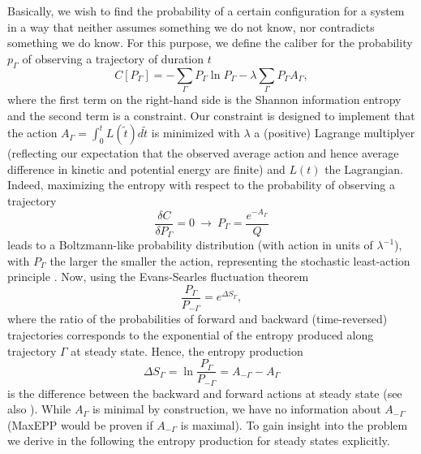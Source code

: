 \documentclass[aps,prl,reprint,singlecolumn,superscriptaddress]{revtex4}
\begin{document}
{Basically, we wish to find the probability of a certain configuration for a system in a way that neither assumes something we 
do not know, nor contradicts something we do know.
For this purpose, we define the {caliber for the probability $p_\Gamma$ of observing a trajectory of duration $t$
\begin{equation}
C[P_\Gamma]=-\sum_{\Gamma}P_\Gamma\ln P_{\Gamma}-\lambda\sum_\Gamma P_\Gamma A_\Gamma,
\end{equation}
where the first term on the right-hand side is the Shannon information entropy and the second term is a constraint.} Our constraint 
is designed to implement that the action $A_\Gamma=\int_{0}^{t}L(\tilde t) d\tilde t$ is minimized with $\lambda$ a (positive) Lagrange multiplyer 
(reflecting our expectation that the observed average action and hence average difference in kinetic and potential energy are finite) 
and $L(t)$ the Lagrangian. Indeed, maximizing the entropy with respect to the probability of observing a trajectory
\begin{equation}
\frac{\delta C}{\delta P_\Gamma}=0\ \rightarrow\  P_\Gamma=\frac{e^{-A_\Gamma}}{Q}
\end{equation}
leads to a Boltzmann-like probability distribution {(with action in units of $\lambda^{-1}$)}, with $P_\Gamma$ the larger the smaller the action, 
representing the stochastic least-action principle \cite{wang06,seifert12}. Now, using the Evans-Searles fluctuation theorem \cite{kurchan98,lebowitz99}
\begin{equation}
\frac{P_\Gamma}{P_{-\Gamma}}=e^{\Delta S_\Gamma},\label{pgamma}
\end{equation}
where the ratio of the probabilities of forward and backward (time-reversed) trajectories corresponds to the 
exponential of the entropy produced along trajectory $\Gamma$ at steady state. Hence, the entropy production
\begin{equation}
\Delta S_\Gamma=\ln\frac{P_\Gamma}{P_{-\Gamma}}=A_{-\Gamma}-A_\Gamma\label{sig}
\end{equation}
is the difference between the backward and forward actions at steady state (see also \cite{seifert12}). 
While $A_\Gamma$ is minimal by construction, we have no information about $A_{-\Gamma}$ (MaxEPP would be proven if 
$A_{-\Gamma}$ is maximal). To gain insight into the problem we derive in the following the entropy production for 
steady states explicitly.

}
\end{document}
